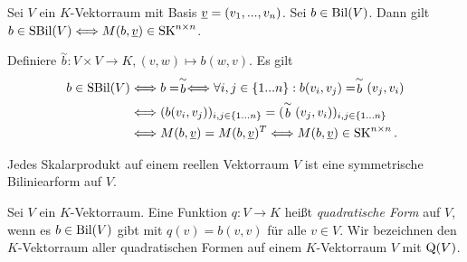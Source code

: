 \documentclass[../../main.tex]{subfiles}
\begin{document}
\begin{pro}\label{13.4.3}
Sei $V$ ein $K$-Vektorraum mit Basis ${\underline v}=(v_1,...,v_n)$. Sei $b\in \operatorname{Bil}(V)$. Dann gilt $b\in \operatorname{SBil}(V)\Longleftrightarrow M(b,\underline{v})\in\operatorname{SK}^{n\times n}$.
\end{pro}
\begin{cproof}
Definiere $\stackrel{\sim}{b}: V\times V\to K, (v,w)\mapsto b(w,v)$. Es gilt
\begin{align*}
b\in\operatorname{SBil}(V)&\Longleftrightarrow b=\stackrel{\sim}{b}\Longleftrightarrow \forall i,j\in\{1...n\}: b(v_i,v_j)=\stackrel{\sim}{b}(v_j,v_i)\\
&\Longleftrightarrow (b(v_i,v_j))_{i,j\in\{1...n\}}=(\stackrel{\sim}{b}(v_j,v_i))_{i,j\in\{1...n\}}\\
&\Longleftrightarrow M(b,{\underline v})=M(b,{\underline v})^T\Longleftrightarrow M(b,{\underline v})\in\operatorname{SK}^{n\times n}.
\end{align*}
\end{cproof}

\begin{bsp}\label{13.4.4}
Jedes Skalarprodukt auf einem reellen Vektorraum $V$ ist eine symmetrische Biliniearform auf $V$.
\end{bsp}
	
\begin{df}\label{13.4.5} 
Sei $V$ ein $K$-Vektorraum. Eine Funktion $q: V\to K$ heißt  \emph{quadratische Form} auf $V$, wenn es $b\in \operatorname{Bil}(V)$ gibt mit $q(v)=b(v,v)$ für alle $v\in V$. Wir bezeichnen den $K$-Vektorraum aller quadratischen Formen auf einem $K$-Vektorraum $V$ mit $\operatorname{Q}(V)$.
\end{df}
\end{document}
